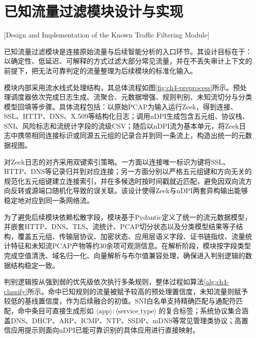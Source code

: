 \section{已知流量过滤模块设计与实现}[Design and Implementation of the Known Traffic Filtering Module]

已知流量过滤模块是连接原始流量与后续智能分析的入口环节。其设计目标在于：以确定性、低延迟、可解释的方式过滤大部分常见流量，并在不丢失审计上下文的前提下，把无法可靠判定的流量整理为后续模块的标准化输入。

模块内部采用流水线式处理结构，其总体流程如图\ref{fig:ch4-preprocess}所示。预处理调度器依次完成日志生成、流聚合、元数据增强、规则判别、未知流切分与分类模型回填等步骤。具体流程包括：以原始PCAP为输入运行Zeek，得到连接、SSL、HTTP、DNS、X.509等结构化日志；调用nDPI生成包含五元组、协议栈、SNI、风险标志和流统计字段的流级CSV；随后以nDPI流为基本单元，将Zeek日志中携带相同连接标识或同源五元组的记录合并到同一条流上，构造出统一的元数据视图。

\begin{figure}[h]
	\centering
\end{figure}

对Zeek日志的对齐采用双键索引策略。一方面以连接唯一标识为键将SSL、HTTP、DNS等记录归并到对应连接；另一方面分别以严格五元组键和方向无关的规范化五元组键建立连接索引，并在多候选时按时间戳就近匹配，避免因双向流方向反转或源端口随机化导致的误关联。该设计使得Zeek与nDPI两套异构输出能够稳定地对应到同一条网络流。

为了避免后续模块依赖松散字段，模块基于Pydantic定义了统一的流元数据模型，并嵌套HTTP、DNS、TLS、流统计、PCAP切分状态以及分类模型结果等子结构，覆盖五元组、传输层协议、加密状态、应用层语义字段、证书链指纹、流量统计特征和未知流PCAP产物等约30余项可观测信息。在解析阶段，模块按字段类型完成空值清洗、域名归一化、向量解析与布尔值兼容处理，确保进入判别逻辑的数据结构稳定一致。

判别逻辑按从强到弱的优先级依次执行多条规则，整体过程如算法\ref{alg:ch4-classify}所示。命中已知规则的流量被赋予较高的预处理置信度，未知流量则赋予较低的基线置信度，作为后续融合的初值。SNI白名单支持精确匹配与通配符匹配，命中条目可直接生成形如 $\langle \mathrm{app} \rangle\!:\!\langle \mathrm{service\_type} \rangle$ 的复合标签；系统协议集合涵盖DNS、DHCP、ARP、ICMP、NTP、SSDP、mDNS等常见管理类协议；高置信应用提示则面向nDPI已能可靠识别的具体应用进行直接映射。



